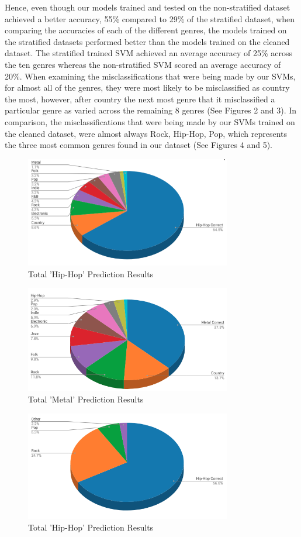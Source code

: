 \documentclass[journal]{IEEEtran}
\begin{document}
\newpage
Hence, even though our models trained and tested on the non-stratified dataset achieved a better accuracy, 55\% compared to 29\% of the stratified dataset, when comparing the accuracies of each of the different genres, the models trained on the stratified datasets performed better than the models trained on the cleaned dataset. The stratified trained SVM achieved an average accuracy of 25\% across the ten genres whereas the non-stratified SVM scored an average accuracy of 20\%. When examining the misclassifications that were being made by our SVMs, for almost all of the genres,  they were most likely to be misclassified as country the most, however, after country the next most genre that it misclassified a particular genre as varied across the remaining 8 genres (See Figures 2 and 3). In comparison, the misclassifications that were being made by our SVMs trained on the cleaned dataset, were almost always Rock, Hip-Hop, Pop, which represents the three most common genres found in our dataset (See Figures 4 and 5).

\begin{figure}[h!]
\centering
\includegraphics[width=9cm]{Figure_5}
\caption{Total 'Hip-Hop' Prediction Results}
\end{figure}

\begin{figure}[h!]
\centering
\includegraphics[width=9cm]{Figure_6}
\caption{Total 'Metal' Prediction Results}
\end{figure}

\begin{figure}[h!]
\centering
\includegraphics[width=9cm]{Figure_2}
\caption{Total 'Hip-Hop' Prediction Results}
\end{figure}
\end{document}
